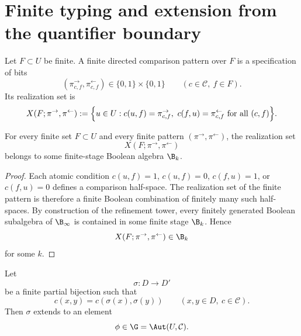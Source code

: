 \section{Finite typing and extension from the quantifier boundary}
\label{sec:einstein-extension}
\begin{definition}
	Let \(F\subset U\) be finite.
	A finite directed comparison pattern over \(F\) is a specification of
	bits
	\[
		(\pi^\rightarrow_{c,f},\pi^\leftarrow_{c,f})\in\{0,1\}\times\{0,1\}
		\qquad
		(c\in\mathcal C,\ f\in F).
	\]
	Its realization set is
	\[
		X(F;\pi^\rightarrow,\pi^\leftarrow)
		:=
		\Bigl\{
		u\in U:
		c(u,f)=\pi^\rightarrow_{c,f},\
		c(f,u)=\pi^\leftarrow_{c,f}
		\text{ for all }(c,f)
		\Bigr\}.
	\]
\end{definition}
\begin{lemma}
	\label{lem:einstein-typing}
	For every finite set \(F\subset U\) and every finite pattern
	\((\pi^\rightarrow,\pi^\leftarrow)\), the realization set
	\[
		X(F;\pi^\rightarrow,\pi^\leftarrow)
	\]
	belongs to some finite-stage Boolean algebra \(\B_k\).
\end{lemma}
\begin{proof}
	Each atomic condition \(c(u,f)=1\), \(c(u,f)=0\), \(c(f,u)=1\), or
	\(c(f,u)=0\) defines a comparison half-space.
	The realization set of the finite pattern is therefore a finite Boolean
	combination of finitely many such half-spaces.
	By construction of the refinement tower, every finitely generated
	Boolean subalgebra of \(\B_\infty\) is contained in some finite stage
	\(\B_k\).
	Hence
	\[
		X(F;\pi^\rightarrow,\pi^\leftarrow)\in \B_k
	\]
	for some \(k\).
\end{proof}
\begin{theorem}
	\label{thm:einstein-extension}
	Let
	\[
		\sigma:D\to D'
	\]
	be a finite partial bijection such that
	\[
		c(x,y)=c(\sigma(x),\sigma(y))
		\qquad
		(x,y\in D,\ c\in\mathcal C).
	\]
	Then \(\sigma\) extends to an element
	\[
		\phi\in \G=\Aut(U,\mathcal C).
	\]
\end{theorem}
